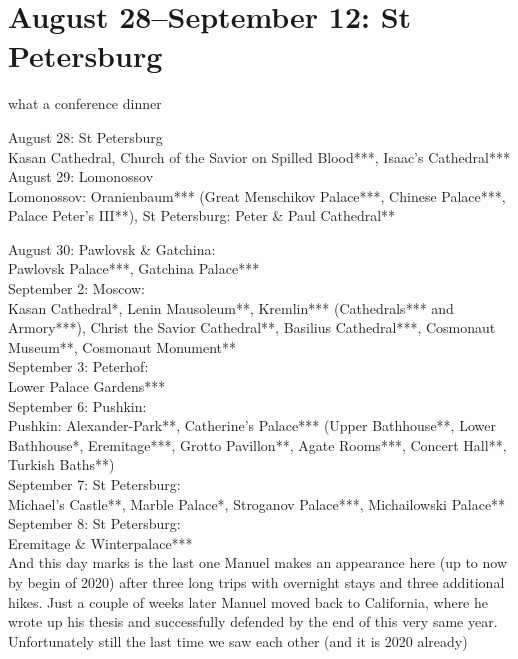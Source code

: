 \section{August 28--September 12: St Petersburg}
\label{2015:StPetersburg}
what a conference dinner

August 28: St Petersburg\\
Kasan Cathedral, Church of the Savior on Spilled Blood***, Isaac's Cathedral***\\

August 29: Lomonossov\\
Lomonossov: Oranienbaum*** (Great Menschikov Palace***, Chinese Palace***, Palace Peter's III**), St Petersburg: Peter \& Paul Cathedral**

August 30: Pawlovsk \& Gatchina:\\
Pawlovsk Palace***, Gatchina Palace***\\

September 2: Moscow:\\
Kasan Cathedral*, Lenin Mausoleum**, Kremlin*** (Cathedrals*** and Armory***), Christ the Savior Cathedral**, Basilius Cathedral***, Cosmonaut Museum**, Cosmonaut Monument**\\

September 3: Peterhof:\\
Lower Palace Gardens***\\

September 6: Pushkin:\\
Pushkin: Alexander-Park**, Catherine's Palace*** (Upper Bathhouse**, Lower Bathhouse*, Eremitage***, Grotto Pavillon**, Agate Rooms***, Concert Hall**, Turkish Baths**)\\

September 7: St Petersburg:\\
Michael's Castle**, Marble Palace*, Stroganov Palace***, Michailowski Palace**\\

September 8: St Petersburg:\\
Eremitage \& Winterpalace***\\

And this day marks is the last one Manuel makes an appearance here (up to now by begin of 2020) after three long trips with overnight stays and three additional hikes. Just a couple of weeks later Manuel moved back to California, where he wrote up his thesis and successfully defended by the end of this very same year. Unfortunately still the last time we saw each other (and it is 2020 already)\\

